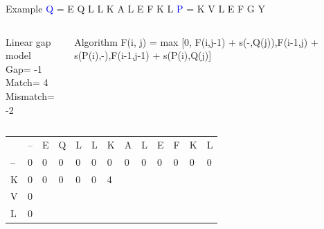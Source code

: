\documentclass{bredelebeamer}
\begin{document}
 
  \begin{frame}{Example}
     \centering
 \textcolor{blue}{Q} = E Q L L K A L E F K L \quad \textcolor{blue}{P} = K V L E F G Y
\begin{columns}
\begin{block}{Linear gap model} \\
Gap= -1 \\
Match= 4 \\
Mismatch= -2
\end{block}
\begin{block}{Algorithm}
 F(i, j) =  max [0, F(i,j-1) + s(-,Q(j)),F(i-1,j) + s(P(i),-),F(i-1,j-1) + s(P(i),Q(j)]
\end{block}
\end{columns}
     
     \begin{table}[]
\centering
\begin{tabular}{*{13}{p{0.4cm}}}
                        & --                     & E                      & Q                      & L                      & L                      & \cellcolor[HTML]{FFFF00}K                      & A                      & L                      & E                      & F                      & K                      & L                      \\ \cline{2-13} 
\multicolumn{1}{l|}{--} & \multicolumn{1}{l|}{0} & \multicolumn{1}{l|}{0} & \multicolumn{1}{l|}{0} & \multicolumn{1}{l|}{0} & \multicolumn{1}{l|}{0} & \multicolumn{1}{l|}{0} & \multicolumn{1}{l|}{0} & \multicolumn{1}{l|}{0} & \multicolumn{1}{l|}{0} & \multicolumn{1}{l|}{0} & \multicolumn{1}{l|}{0} & \multicolumn{1}{l|}{0} \\ \cline{2-13} 
\multicolumn{1}{l|}{\cellcolor[HTML]{FFFF00}K}  & \multicolumn{1}{l|}{0} &      \multicolumn{1}{l|}{0}  & \multicolumn{1}{l|}{0}  & \multicolumn{1}{l|}{0}  & \multicolumn{1}{l|}{0}  & \multicolumn{1}{l|}{4}  & \multicolumn{1}{l|}{}  & \multicolumn{1}{l|}{}  & \multicolumn{1}{l|}{}  & \multicolumn{1}{l|}{}  & \multicolumn{1}{l|}{}  & \multicolumn{1}{l|}{}  \\ \cline{2-13} 
\multicolumn{1}{l|}{V}  & \multicolumn{1}{l|}{0} & \multicolumn{1}{l|}{}  & \multicolumn{1}{l|}{}  & \multicolumn{1}{l|}{}  & \multicolumn{1}{l|}{}  & \multicolumn{1}{l|}{}  & \multicolumn{1}{l|}{}  & \multicolumn{1}{l|}{}  & \multicolumn{1}{l|}{}  & \multicolumn{1}{l|}{}  & \multicolumn{1}{l|}{}  & \multicolumn{1}{l|}{}  \\ \cline{2-13}  %
\multicolumn{1}{l|}{L}  & \multicolumn{1}{l|}{0} & \multicolumn{1}{l|}{}  & \multicolumn{1}{l|}{}  & \multicolumn{1}{l|}{}  & \multicolumn{1}{l|}{}  & \multicolumn{1}{l|}{}  & \multicolumn{1}{l|}{}  & \multicolumn{1}{l|}{}  & \multicolumn{1}{l|}{}  & \multicolumn{1}{l|}{}  & \multicolumn{1}{l|}{}  & \multicolumn{1}{l|}{}  \\ \cline{2-13} 

\end{tabular}
\end{table}
\end{frame}
\end{document}
